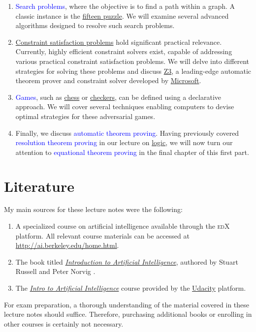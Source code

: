 \begin{enumerate}
\item \textcolor{blue}{Search problems}, where the objective is to find a path within a graph. A classic
      instance is the \href{https://en.wikipedia.org/wiki/15_puzzle}{fifteen puzzle}. We will examine several
      advanced algorithms designed to resolve such search problems. 
\item \href{https://en.wikipedia.org/wiki/Constraint_satisfaction_problem}{Constraint satisfaction
      problems} hold significant practical relevance. Currently, highly efficient constraint solvers exist,
      capable of addressing various practical constraint satisfaction problems. We will delve into different
      strategies for solving these problems and discuss \href{https://github.com/Z3Prover/z3}{Z3}, a
      leading-edge automatic theorem prover and constraint solver developed by
      \href{https://www.microsoft.com/en-us/research/project/z3-3/}{Microsoft}. 
\item \textcolor{blue}{Games}, such as \href{https://en.wikipedia.org/wiki/Chess}{chess} or
      \href{https://en.wikipedia.org/wiki/checkers}{checkers}, can be defined using a declarative
      approach. We will cover several techniques enabling computers to devise optimal strategies for these
      adversarial games. 
\item Finally, we discuss \textcolor{blue}{automatic theorem proving}. Having previously covered
      \textcolor{blue}{resolution theorem proving} in our lecture on
      \href{https://github.com/karlstroetmann/Logic}{logic}, we will now turn our attention to
      \textcolor{blue}{equational theorem proving} in the final chapter of this first part. 
\end{enumerate}

\section{Literature}
My main sources for these lecture notes were the following:
\begin{enumerate}
    \item A specialized course on artificial intelligence available through the \textsc{edX} platform. All
          relevant course materials can be accessed at
          \href{http://ai.berkeley.edu/home.html}{http://ai.berkeley.edu/home.html}. 
    \item The book titled
          \href{https://www.amazon.de/Artificial-Intelligence-Modern-Approach-Global/dp/1292401133/}{\textit{Introduction to Artificial Intelligence}},
          authored by Stuart Russell and Peter Norvig \cite{russell:2020}. 
    \item The \href{https://www.udacity.com/course/intro-to-artificial-intelligence--cs271}{\textit{Intro to
          Artificial Intelligence}} course provided by the \href{https://www.udacity.com}{Udacity} platform. 
\end{enumerate}
For exam preparation, a thorough understanding of the material covered in these lecture notes should
suffice. Therefore, purchasing additional books or enrolling in other courses is certainly not necessary.

